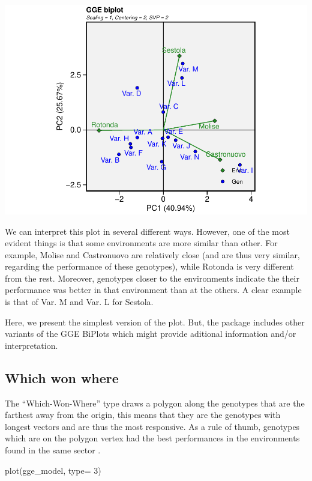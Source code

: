 \documentclass[
]{book}
\newenvironment{Shaded}{\begin{snugshade}}{\end{snugshade}}
\newcommand{\AttributeTok}[1]{\textcolor[rgb]{0.77,0.63,0.00}{#1}}
\newcommand{\DecValTok}[1]{\textcolor[rgb]{0.00,0.00,0.81}{#1}}
\newcommand{\FunctionTok}[1]{\textcolor[rgb]{0.00,0.00,0.00}{#1}}
\newcommand{\NormalTok}[1]{#1}
\begin{document}
\includegraphics{PPB-Toolkit-for-R-and-R-Studio_files/figure-latex/unnamed-chunk-127-1.pdf}

We can interpret this plot in several different ways. However, one of the most evident things is that some environments are more similar than other. For example, Molise and Castronuovo are relatively close (and are thus very similar, regarding the performance of these genotypes), while Rotonda is very different from the rest. Moreover, genotypes closer to the environments indicate the their performance was better in that environment than at the others. A clear example is that of Var. M and Var. L for Sestola.

Here, we present the simplest version of the plot. But, the package includes other variants of the GGE BiPlots which might provide aditional information and/or interpretation.

\hypertarget{which-won-where}{%
\subsection{Which won where}\label{which-won-where}}

The ``Which-Won-Where'' type draws a polygon along the genotypes that are the farthest away from the origin, this means that they are the genotypes with longest vectors and are thus the most responsive. As a rule of thumb, genotypes which are on the polygon vertex had the best performances in the environments found in the same sector \citet{yan2000cultivar}.

\begin{Shaded}
\begin{Highlighting}[]
\FunctionTok{plot}\NormalTok{(gge\_model, }\AttributeTok{type=} \DecValTok{3}\NormalTok{)}
\end{Highlighting}
\end{Shaded}
\end{document}
